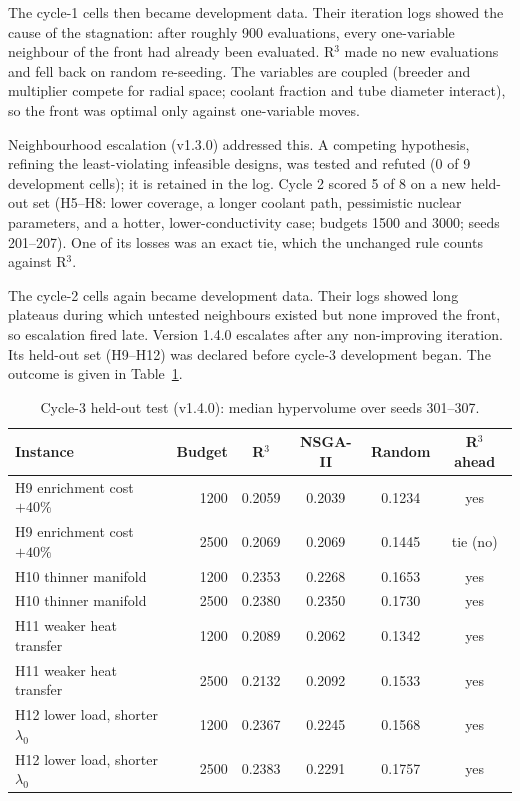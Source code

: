 \documentclass[11pt]{article}
\begin{document}
The cycle-1 cells then became development data. Their iteration logs showed the cause of the
stagnation: after roughly 900 evaluations, every one-variable neighbour of the front had already
been evaluated. R$^3$ made no new evaluations and fell back on random re-seeding. The variables are
coupled (breeder and multiplier compete for radial space; coolant fraction and tube diameter interact),
so the front was optimal only against one-variable moves.

Neighbourhood escalation (v1.3.0) addressed this. A competing hypothesis, refining the least-violating
infeasible designs, was tested and refuted (0 of 9 development cells); it is retained in the log.
Cycle 2 scored 5 of 8 on a new held-out set (H5--H8: lower coverage, a longer coolant path,
pessimistic nuclear parameters, and a hotter, lower-conductivity case; budgets 1500 and 3000;
seeds 201--207). One of its losses was an exact tie, which the unchanged rule counts against R$^3$.

The cycle-2 cells again became development data. Their logs showed long plateaus during which
untested neighbours existed but none improved the front, so escalation fired late. Version 1.4.0 escalates after
any non-improving iteration. Its held-out set (H9--H12) was declared before cycle-3 development began.
The outcome is given in Table~\ref{tab:ho3}.

\begin{table}[h]
\centering
\caption{Cycle-3 held-out test (v1.4.0): median hypervolume over seeds 301--307.}
\label{tab:ho3}
\begin{tabular}{lrcccc}
\toprule
Instance & Budget & R$^3$ & NSGA-II & Random & R$^3$ ahead \\
\midrule
H9 enrichment cost $+40\%$ & 1200 & 0.2059 & 0.2039 & 0.1234 & yes \\
H9 enrichment cost $+40\%$ & 2500 & 0.2069 & 0.2069 & 0.1445 & tie (no) \\
H10 thinner manifold & 1200 & 0.2353 & 0.2268 & 0.1653 & yes \\
H10 thinner manifold & 2500 & 0.2380 & 0.2350 & 0.1730 & yes \\
H11 weaker heat transfer & 1200 & 0.2089 & 0.2062 & 0.1342 & yes \\
H11 weaker heat transfer & 2500 & 0.2132 & 0.2092 & 0.1533 & yes \\
H12 lower load, shorter $\lambda_0$ & 1200 & 0.2367 & 0.2245 & 0.1568 & yes \\
H12 lower load, shorter $\lambda_0$ & 2500 & 0.2383 & 0.2291 & 0.1757 & yes \\
\bottomrule
\end{tabular}
\end{table}
\end{document}
